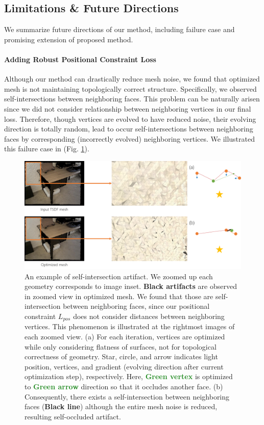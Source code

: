\subsection{Limitations \& Future Directions}

We summarize future directions of our method, including failure case and promising extension of proposed method.
\paragraph{Adding Robust Positional Constraint Loss}
Although our method can drastically reduce mesh noise, we found that optimized mesh is not maintaining topologically correct structure. 
Specifically, we observed self-intersections between neighboring faces. 
This problem can be naturally arisen since we did not consider relationship between neighboring vertices in our final loss. 
Therefore, though vertices are evolved to have reduced noise, their evolving direction is totally random, lead to occur self-intersections between neighboring faces by corresponding (incorrectly evolved) neighboring vertices. 
We illustrated this failure case in (Fig. \ref{fig:self_intersection}).


\begin{figure}
    \includegraphics[width=\columnwidth]{figures/4_future_work_self_intersection.png}
    \caption{An example of self-intersection artifact. We zoomed up each geometry corresponds to image inset. 
    \textbf{Black artifacts} are observed in zoomed view in optimized mesh. We found that those are self-intersection between neighboring faces, since our positional constraint $L_{pos}$ does not consider distances between neighboring vertices. 
    This phenomenon is illustrated at the rightmost images of each zoomed view. 
    (a) For each iteration, vertices are optimized while only considering flatness of surfaces, not for topological correctness of geometry. 
    Star, circle, and arrow indicates light position, vertices, and gradient (evolving direction after current optimization step), respectively. 
    Here, \textbf{\textcolor{ForestGreen}{Green vertex}} is optimized to \textbf{\textcolor{ForestGreen}{Green arrow}} direction so that it occludes another face. 
    (b) Consequently, there exists a self-intersection between neighboring faces (\textbf{Black line}) although the entire mesh noise is reduced, resulting self-occluded artifact.}
    \label{fig:self_intersection}
\end{figure}

